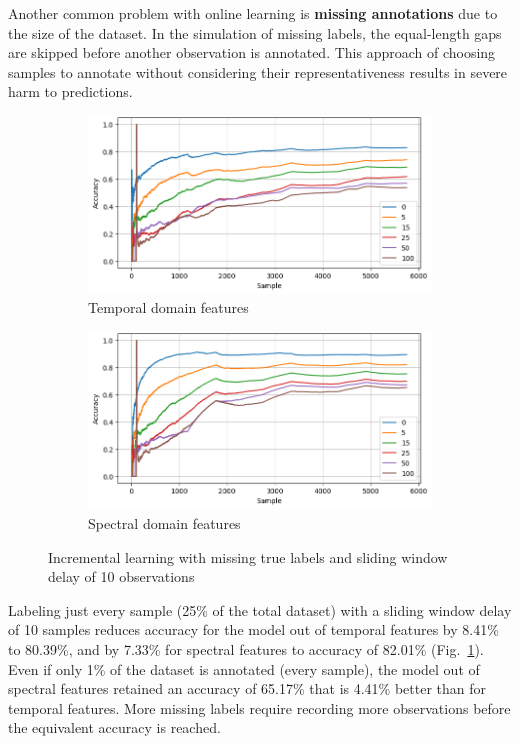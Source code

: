 Another common problem with online learning is \textbf{missing annotations} due to the size of the dataset. In the simulation of missing labels, the equal-length gaps are skipped before another observation is annotated. This approach of choosing samples to annotate without considering their representativeness results in severe harm to predictions. 

\begin{figure}[ht]
    \centering
    \begin{subfigure}[b]{0.49\textwidth}
        \includegraphics[width=\textwidth]{assets/design/gradual-learning-skip-temporal-domain-fault.png}
        \caption{Temporal domain features}
    \end{subfigure}
    \hfill
    \begin{subfigure}[b]{0.49\textwidth}
        \includegraphics[width=\textwidth]{assets/design/gradual-learning-skip-spectral-domain-fault.png}
        \caption{Spectral domain features}
    \end{subfigure}
    \caption{Incremental learning with missing true labels and sliding window delay of 10 observations}
    \label{fig:design:online-label-skip}
\end{figure}
 
Labeling just every  sample (25\% of the total dataset) with a sliding window delay of 10 samples reduces accuracy for the model out of temporal features by 8.41\% to 80.39\%, and by 7.33\% for spectral features to accuracy of 82.01\% (Fig.~\ref{fig:design:online-label-skip}). Even if only 1\% of the dataset is annotated (every  sample), the model out of spectral features retained an accuracy of 65.17\% that is 4.41\% better than for temporal features.  More missing labels require recording more observations before the equivalent accuracy is reached.